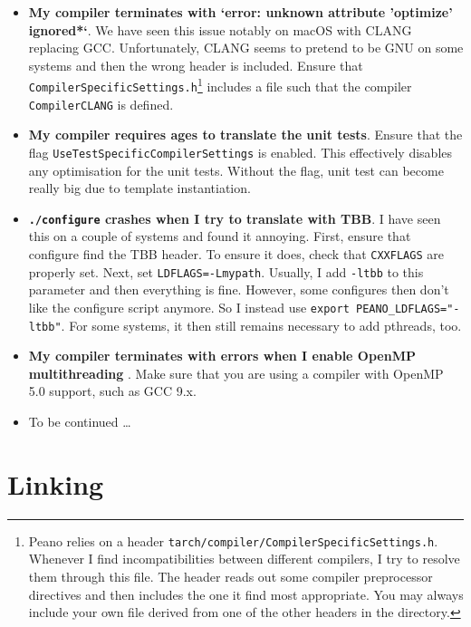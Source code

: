 \begin{itemize}
  \item \textbf{ My compiler terminates with `error: unknown
   attribute 'optimize' ignored*`}. We have seen this issue notably on macOS
   with CLANG replacing GCC. Unfortunately, CLANG seems to pretend to be GNU on
   some systems and then the wrong header is included. Ensure that
   \texttt{CompilerSpecificSettings.h}\footnote{Peano relies on a header \texttt{tarch/compiler/CompilerSpecificSettings.h}.
Whenever I find incompatibilities between different compilers, I try to resolve them through this file. 
The header reads out some compiler preprocessor directives and then includes the
one it find most appropriate. 
You may always include your own file derived from one of the other headers in
the directory.} includes a file such that the
   compiler
   \texttt{CompilerCLANG} is defined.
  \item \textbf{ My compiler requires ages to translate the unit tests}. Ensure
  that the flag \linebreak \texttt{UseTestSpecificCompilerSettings} is enabled.
  This effectively disables any optimisation for the unit tests. Without the
  flag, unit test can become really big due to template instantiation.
  \item \textbf{\texttt{./configure} crashes when I try to translate with TBB}.
  I have seen this on a couple of systems and found it annoying. 
  First, ensure that configure
  find the TBB header. To ensure it does, check that \texttt{CXXFLAGS} are properly
  set. Next, set \texttt{LDFLAGS=-Lmypath}. Usually, I add \texttt{-ltbb} to 
  this parameter and then everything is fine. However, some configures then don't 
  like the configure script anymore. So I instead use \texttt{export PEANO\_LDFLAGS="-ltbb"}. 
  For some systems, it then still remains necessary to add pthreads, too.
  \item \textbf{ My compiler terminates with errors when I enable OpenMP multithreading }.
  Make sure that you are using a compiler with OpenMP 5.0 support, such as GCC 9.x.
  \item To be continued \dots
\end{itemize}



\section{Linking}

